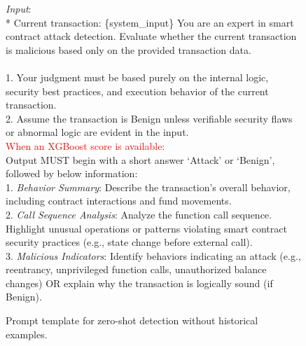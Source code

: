 \begin{figure}[t]
	\begin{tcolorbox}[title=Prompt template for zero-shot detection]
		\emph{Input}:\\
		* Current transaction:  \{system\_input\}
		\tcbline
		You are an expert in smart contract attack detection. Evaluate whether the current transaction is malicious based only on the provided transaction data.\\
		 \\
		1. Your judgment must be based purely on the internal logic, security best practices, and execution behavior of the current transaction. \\
		2. Assume the transaction is Benign unless verifiable security flaws or abnormal logic are evident in the input.\\
		\tcbline
		\textcolor{red}{When an XGBoost score is available:}\\
		\tcbline
		Output MUST begin with a short answer `Attack' or `Benign', followed by below information: \\ 
		1. \emph{Behavior Summary}:  Describe the transaction's overall behavior, including contract interactions and fund movements.
		\\
		2. \emph{Call Sequence Analysis}:  Analyze the function call sequence. Highlight unusual operations or patterns violating smart contract security practices (e.g., state change before external call).\\
		3. \emph{Malicious Indicators}: Identify behaviors indicating an attack (e.g., reentrancy, unprivileged function calls, unauthorized balance changes) OR explain why the transaction is logically sound (if Benign).
	\end{tcolorbox}
	
	\caption{Prompt template for zero-shot detection without historical examples.}
	\label{fig:prompt2}
\end{figure}


